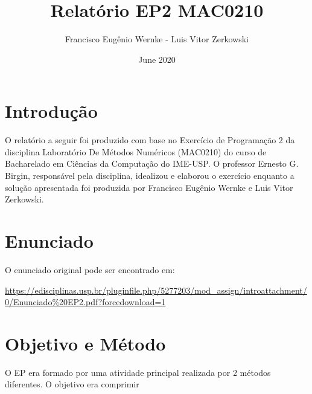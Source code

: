 \documentclass{article}
\title{Relatório EP2 MAC0210}
\author{Francisco Eugênio Wernke - Luis Vitor Zerkowski}
\date{June 2020}
\begin{document}
\maketitle

\newpage

\section{Introdução}
O relatório a seguir foi produzido com base no Exercício de Programação 2 da disciplina Laboratório De Métodos Numéricos (MAC0210) do curso de Bacharelado em Ciências da Computação do IME-USP. O professor Ernesto G. Birgin, responsável pela disciplina, idealizou e elaborou o exercício enquanto a solução apresentada foi produzida por Francisco Eugênio Wernke e Luis Vitor Zerkowski.

\section{Enunciado}
 O enunciado original pode ser encontrado em:

\url{https://edisciplinas.usp.br/pluginfile.php/5277203/mod_assign/introattachment/0/Enunciado%20EP2.pdf?forcedownload=1}

\section{Objetivo e Método}
O EP era formado por uma atividade principal realizada por 2 métodos diferentes. O objetivo era comprimir
\end{document}
